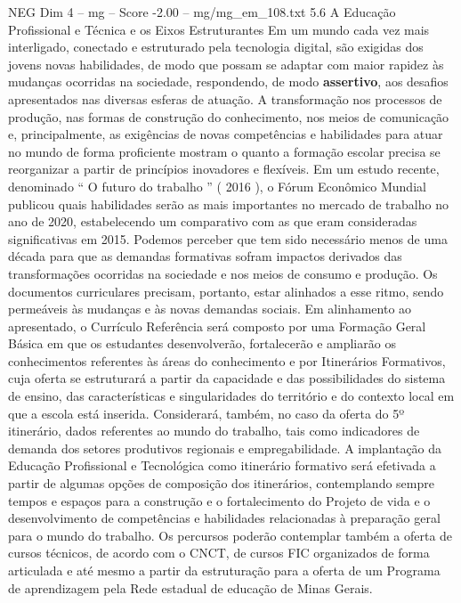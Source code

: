 \begin{textsample}{NEG Dim 4 – mg – Score -2.00 – mg/mg\_em\_108.txt}  \label{ex:f4_neg_098}
5.6 A Educação Profissional e Técnica e os Eixos Estruturantes Em um mundo cada vez mais interligado, conectado e estruturado pela tecnologia digital, são exigidas dos jovens novas habilidades, de modo que possam se adaptar com maior rapidez às mudanças ocorridas na sociedade, respondendo, de modo \textbf{assertivo}, aos desafios apresentados nas diversas esferas de atuação.
A transformação nos processos de produção, nas formas de construção do conhecimento, nos meios de comunicação e, principalmente, as exigências de novas competências e habilidades para atuar no mundo de forma proficiente mostram o quanto a formação escolar precisa se reorganizar a partir de princípios inovadores e flexíveis.
Em um estudo recente, denominado “ O futuro do trabalho ” ( 2016 ), o Fórum Econômico Mundial publicou quais habilidades serão as mais importantes no mercado de trabalho no ano de 2020, estabelecendo um comparativo com as que eram consideradas significativas em 2015.
Podemos perceber que tem sido necessário menos de uma década para que as demandas formativas sofram impactos derivados das transformações ocorridas na sociedade e nos meios de consumo e produção.
Os documentos curriculares precisam, portanto, estar alinhados a esse ritmo, sendo permeáveis às mudanças e às novas demandas sociais.
Em alinhamento ao apresentado, o Currículo Referência será composto por uma Formação Geral Básica em que os estudantes desenvolverão, fortalecerão e ampliarão os conhecimentos referentes às áreas do conhecimento e por Itinerários Formativos, cuja oferta se estruturará a partir da capacidade e das possibilidades do sistema de ensino, das características e singularidades do território e do contexto local em que a escola está inserida.
Considerará, também, no caso da oferta do 5º itinerário, dados referentes ao mundo do trabalho, tais como indicadores de demanda dos setores produtivos regionais e empregabilidade.
A implantação da Educação Profissional e Tecnológica como itinerário formativo será efetivada a partir de algumas opções de composição dos itinerários, contemplando sempre tempos e espaços para a construção e o fortalecimento do Projeto de vida e o desenvolvimento de competências e habilidades relacionadas à preparação geral para o mundo do trabalho.
Os percursos poderão contemplar também a oferta de cursos técnicos, de acordo com o CNCT, de cursos FIC organizados de forma articulada e até mesmo a partir da estruturação para a oferta de um Programa de aprendizagem pela Rede estadual de educação de Minas Gerais.

\end{textsample}
